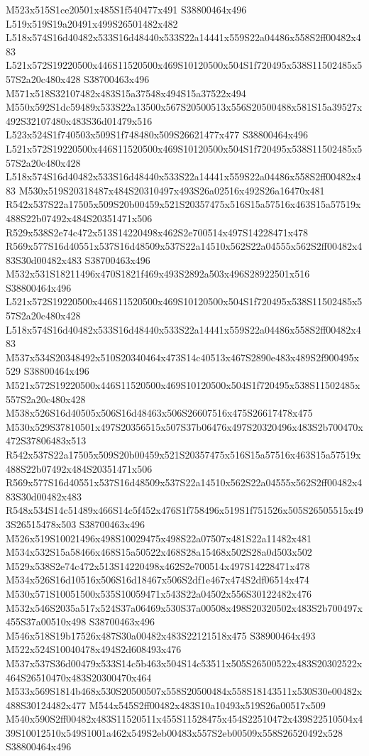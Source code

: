 \documentclass{article}
\begin{document}
\begin{multicols}{2}
M523x515S1ce20501x485S1f540477x491 S38800464x496 L519x519S19a20491x499S26501482x482 L518x574S16d40482x533S16d48440x533S22a14441x559S22a04486x558S2ff00482x483 L521x572S19220500x446S11520500x469S10120500x504S1f720495x538S11502485x557S2a20c480x428 S38700463x496 M571x518S32107482x483S15a37548x494S15a37522x494 M550x592S1dc59489x533S22a13500x567S20500513x556S20500488x581S15a39527x492S32107480x483S36d01479x516 L523x524S1f740503x509S1f748480x509S26621477x477 S38800464x496 L521x572S19220500x446S11520500x469S10120500x504S1f720495x538S11502485x557S2a20c480x428 L518x574S16d40482x533S16d48440x533S22a14441x559S22a04486x558S2ff00482x483 M530x519S20318487x484S20310497x493S26a02516x492S26a16470x481 R542x537S22a17505x509S20b00459x521S20357475x516S15a57516x463S15a57519x488S22b07492x484S20351471x506 R529x538S2e74c472x513S14220498x462S2e700514x497S14228471x478 R569x577S16d40551x537S16d48509x537S22a14510x562S22a04555x562S2ff00482x483S30d00482x483 S38700463x496 M532x531S18211496x470S1821f469x493S2892a503x496S28922501x516 S38800464x496 L521x572S19220500x446S11520500x469S10120500x504S1f720495x538S11502485x557S2a20c480x428 L518x574S16d40482x533S16d48440x533S22a14441x559S22a04486x558S2ff00482x483 M537x534S20348492x510S20340464x473S14c40513x467S2890e483x489S2f900495x529 S38800464x496 M521x572S19220500x446S11520500x469S10120500x504S1f720495x538S11502485x557S2a20c480x428 M538x526S16d40505x506S16d48463x506S26607516x475S26617478x475 M530x529S37810501x497S20356515x507S37b06476x497S20320496x483S2b700470x472S37806483x513 R542x537S22a17505x509S20b00459x521S20357475x516S15a57516x463S15a57519x488S22b07492x484S20351471x506 R569x577S16d40551x537S16d48509x537S22a14510x562S22a04555x562S2ff00482x483S30d00482x483 R548x534S14c51489x466S14c5f452x476S1f758496x519S1f751526x505S26505515x493S26515478x503 S38700463x496 M526x519S10021496x498S10029475x498S22a07507x481S22a11482x481 M534x532S15a58466x468S15a50522x468S28a15468x502S28a0d503x502 M529x538S2e74c472x513S14220498x462S2e700514x497S14228471x478 M534x526S16d10516x506S16d18467x506S2df1e467x474S2df06514x474 M530x571S10051500x535S10059471x543S22a04502x556S30122482x476 M532x546S2035a517x524S37a06469x530S37a00508x498S20320502x483S2b700497x455S37a00510x498 S38700463x496 M546x518S19b17526x487S30a00482x483S22121518x475 S38900464x493 M522x524S10040478x494S2d608493x476 M537x537S36d00479x533S14c5b463x504S14c53511x505S26500522x483S20302522x464S26510470x483S20300470x464 M533x569S1814b468x530S20500507x558S20500484x558S18143511x530S30e00482x488S30124482x477 M544x545S2ff00482x483S10a10493x519S26a00517x509 M540x590S2ff00482x483S11520511x455S11528475x454S22510472x439S22510504x439S10012510x549S1001a462x549S2eb00483x557S2eb00509x558S26520492x528 S38800464x496


\end{multicols}
\end{document}
